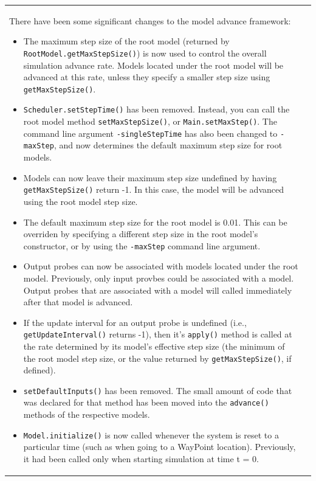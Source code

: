 \documentclass{article}
\begin{document}
\begin{tabular}{ll}
There have been some significant changes to the model advance
framework:

\begin{itemize}

\item The maximum step size of the root model (returned by
  {\tt RootModel.getMaxStepSize()}) is now used to control the overall
  simulation advance rate. Models located under the root model will be
  advanced at this rate, unless they specify a smaller step size using
  {\tt getMaxStepSize()}.

\item {\tt Scheduler.setStepTime()} has been removed. Instead, you can call
  the root model method {\tt setMaxStepSize()}, or {\tt Main.setMaxStep()}.
  The command line argument {\tt -singleStepTime} has also been changed to
  {\tt -maxStep}, and now determines the default maximum step size for
  root models.

\item Models can now leave their maximum step size undefined by having
  {\tt getMaxStepSize()} return -1. In this case, the model will be
  advanced using the root model step size.

\item The default maximum step size for the root model is 0.01. This can
  be overriden by specifying a different step size in the root model's
  constructor, or by using the {\tt -maxStep} command line argument.

\item Output probes can now be associated with models located under the
  root model. Previously, only input provbes could be associated with
  a model. Output probes that are associated with a model will called
  immediately after that model is advanced.

\item If the update interval for an output probe is undefined (i.e.,
  {\tt getUpdateInterval()} returns -1), then it's {\tt apply()} method is
  called at the rate determined by its model's effective step size
  (the minimum of the root model step size, or the value returned by
  {\tt getMaxStepSize()}, if defined).

\item {\tt setDefaultInputs()} has been removed. The small amount of code that
  was declared for that method has been moved into the {\tt advance()}
  methods of the respective models.
  
\item {\tt Model.initialize()} is now called whenever the system is reset to a
  particular time (such as when going to a WayPoint
  location). Previously, it had been called only when starting
  simulation at time t = 0.


\end{itemize}
\end{tabular}
\end{document}
